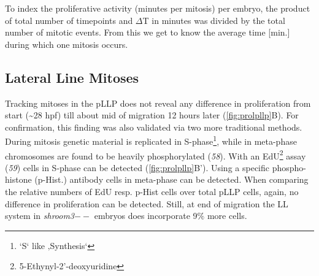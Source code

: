 \documentclass[11pt,singlespacinge,twoside]{reedthesis} %
\begin{document}
To index the proliferative activity (minutes per mitosis) per embryo, the product of total number of timepoints and \(\Delta\)T in minutes was divided by the total number of mitotic events. From this we get to know the average time {[}min.{]} during which one mitosis occurs.\newline


\hypertarget{res-prolpllp}{%
\subsection{Lateral Line Mitoses}\label{res-prolpllp}}

Tracking mitoses in the pLLP does not reveal any difference in proliferation from start (\textasciitilde{}28 hpf) till about mid of migration 12 hours later (\ref{fig:prolpllp}B). For confirmation, this finding was also validated via two more traditional methods. During mitosis genetic material is replicated in S-phase\footnote{`S` like ‚Synthesis`}, while in meta-phase chromosomes are found to be heavily phosphorylated (\emph{58}). With an EdU\footnote{5-Ethynyl-2'-deoxyuridine} assay (\emph{59}) cells in S-phase can be detected (\ref{fig:prolpllp}B'). Using a specific phospho-histone (p-Hist.) antibody cells in meta-phase can be detected. When comparing the relative numbers of EdU resp. p-Hist cells over total pLLP cells, again, no difference in proliferation can be detected. Still, at end of migration the LL system in \emph{shroom3}\(--\) embryos does incorporate 9\(\%\) more cells.
\end{document}
